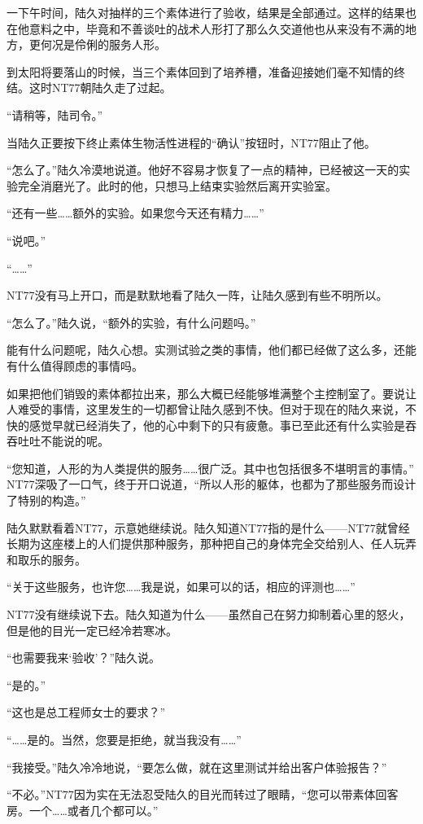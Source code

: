 一下午时间，陆久对抽样的三个素体进行了验收，结果是全部通过。这样的结果也在他意料之中，毕竟和不善谈吐的战术人形打了那么久交道他也从来没有不满的地方，更何况是伶俐的服务人形。

到太阳将要落山的时候，当三个素体回到了培养槽，准备迎接她们毫不知情的终结。这时NT77朝陆久走了过起。

“请稍等，陆司令。”

当陆久正要按下终止素体生物活性进程的“确认”按钮时，NT77阻止了他。

“怎么了。”陆久冷漠地说道。他好不容易才恢复了一点的精神，已经被这一天的实验完全消磨光了。此时的他，只想马上结束实验然后离开实验室。

“还有一些……额外的实验。如果您今天还有精力……”

“说吧。”

“……”

NT77没有马上开口，而是默默地看了陆久一阵，让陆久感到有些不明所以。

“怎么了。”陆久说，“额外的实验，有什么问题吗。”

能有什么问题呢，陆久心想。实测试验之类的事情，他们都已经做了这么多，还能有什么值得顾虑的事情吗。

如果把他们销毁的素体都拉出来，那么大概已经能够堆满整个主控制室了。要说让人难受的事情，这里发生的一切都曾让陆久感到不快。但对于现在的陆久来说，不快的感觉早就已经消失了，他的心中剩下的只有疲惫。事已至此还有什么实验是吞吞吐吐不能说的呢。

“您知道，人形的为人类提供的服务……很广泛。其中也包括很多不堪明言的事情。” NT77深吸了一口气，终于开口说道，“所以人形的躯体，也都为了那些服务而设计了特别的构造。”

陆久默默看着NT77，示意她继续说。陆久知道NT77指的是什么——NT77就曾经长期为这座楼上的人们提供那种服务，那种把自己的身体完全交给别人、任人玩弄和取乐的服务。

“关于这些服务，也许您……我是说，如果可以的话，相应的评测也……”

NT77没有继续说下去。陆久知道为什么——虽然自己在努力抑制着心里的怒火，但是他的目光一定已经冷若寒冰。

“也需要我来‘验收’？”陆久说。

“是的。”

“这也是总工程师女士的要求？”

“……是的。当然，您要是拒绝，就当我没有……”

“我接受。”陆久冷冷地说，“要怎么做，就在这里测试并给出客户体验报告？”

“不必。”NT77因为实在无法忍受陆久的目光而转过了眼睛，“您可以带素体回客房。一个……或者几个都可以。”

